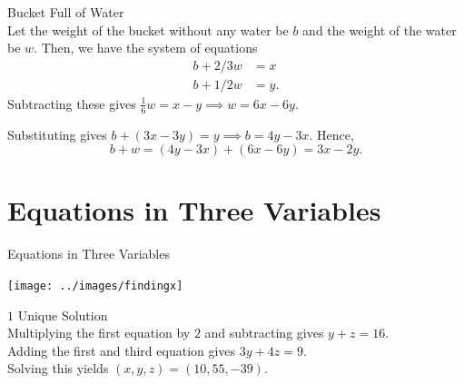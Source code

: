 \documentclass[xcolor=dvipsnames, fontsize=11pt, %
pagesize, %
parskip=half-, t]{beamer}
\begin{document}
\begin{frame}{Bucket Full of Water}
	 ~\\
	
	Let the weight of the bucket without any water be $b$ and the weight of the water be $w$. Then, we have the system of equations \begin{align*} b+2/3w&=x \\
	b+1/2w&=y. \end{align*}
	Subtracting these gives $\frac{1}{6}w=x-y\implies w=6x-6y$. \medskip
	
	Substituting gives $b+\left(3x-3y\right)=y\implies b=4y-3x$. Hence, $$b+w=\left(4y-3x\right)+\left(6x-6y\right)=\boxed{3x-2y}.$$
\end{frame}
\section{Equations in Three Variables}
\begin{frame}[c]{Equations in Three Variables}
	\centering
\end{frame}

\begin{frame}[c]
	\centering
	\texttt{[image: ../images/findingx]}
\end{frame}

\begin{frame}{$1$ Unique Solution}
		 ~\\
	Multiplying the first equation by $2$ and subtracting gives $y+z=16$. ~\\
	
Adding the first and third equation gives $3y+4z=9$. ~\\

Solving this yields $(x, y, z)=(10, 55, -39)$. 
\end{frame}
\end{document}
